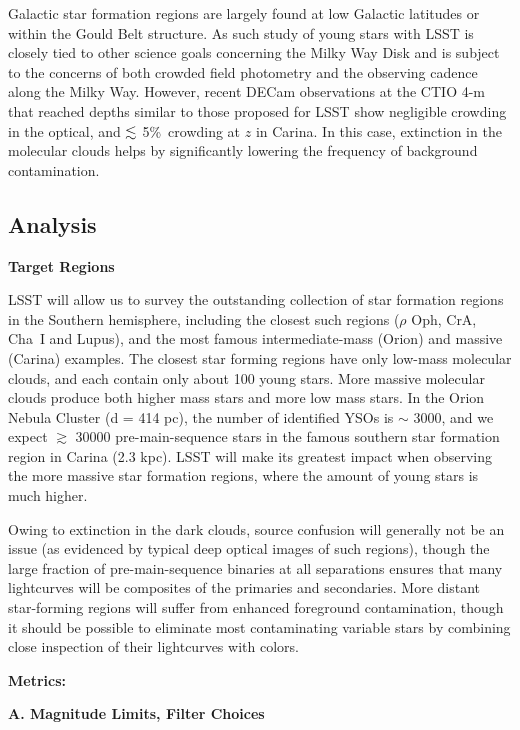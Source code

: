 Galactic star formation regions are largely found at low Galactic
latitudes or within the Gould Belt structure. As such study of young
stars with LSST is closely tied to other science goals concerning the
Milky Way Disk and is subject to the concerns of both crowded field
photometry and the observing cadence along the Milky Way. However, recent
DECam observations at the CTIO 4-m that reached depths similar to those
proposed for LSST show negligible crowding in the optical, and $\lesssim$
5\%\ crowding at $z$ in Carina. In this case, extinction in the molecular
clouds helps by significantly lowering the frequency of background contamination.


\subsection{Analysis}
\label{sec:\secname:analysis}

{\bf Target Regions}

LSST will allow us to survey the outstanding collection of
star formation regions in the Southern hemisphere, including the closest
such regions ($\rho$ Oph, CrA, Cha~I and Lupus), and the most famous intermediate-mass
(Orion) and massive (Carina) examples.
The closest star forming regions have only low-mass molecular clouds, and each contain
only about 100 young stars. More massive molecular clouds produce both higher
mass stars and more low mass stars. In the Orion Nebula Cluster (d = 414 pc), the number of
identified YSOs is $\sim$ 3000, and we expect $\gtrsim$ 30000 pre-main-sequence
stars in the famous southern star formation region in Carina (2.3 kpc).
LSST will make its greatest impact
when observing the more massive star formation regions, where the amount
of young stars is much higher.

Owing to extinction in the dark clouds,
source confusion will generally not be an issue (as evidenced by typical
deep optical images of such regions), though the large fraction
of pre-main-sequence binaries at all separations ensures that many
lightcurves will be composites of the primaries and secondaries.
More distant star-forming regions will suffer from enhanced foreground
contamination, though it should be possible to eliminate most contaminating
variable stars by combining close inspection of their lightcurves with
colors.

{\bf Metrics:}

{\bf A. Magnitude Limits, Filter Choices}

